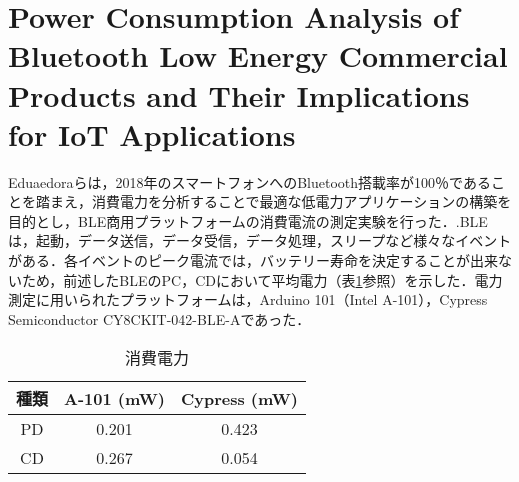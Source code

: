 \section{Power Consumption Analysis of Bluetooth Low Energy Commercial Products and Their Implications for IoT Applications}
Eduaedoraらは，2018年のスマートフォンへのBluetooth搭載率が100％であることを踏まえ，消費電力を分析することで最適な低電力アプリケーションの構築を目的とし，BLE商用プラットフォームの消費電流の測定実験を行った．\cite{Garcia-Espinosa2018}.BLEは，起動，データ送信，データ受信，データ処理，スリープなど様々なイベントがある．各イベントのピーク電流では，バッテリー寿命を決定することが出来ないため，前述したBLEのPC，CDにおいて平均電力（表\ref{fig:power_consumption}参照）を示した．電力測定に用いられたプラットフォームは，Arduino 101（Intel A-101），Cypress Semiconductor CY8CKIT-042-BLE-Aであった．

\begin{table}
    \raggedleft
    \caption{消費電力}
    \label{fig:power_consumption}
    \centering
    \begin{tabular}{|c|c|c|}
    \hline
    \textbf{種類} & \textbf{A-101 (mW)} & \textbf{Cypress (mW)} \\ \hline
    PD          & 0.201               & 0.423                 \\ \hline
    CD          & 0.267               & 0.054                 \\ \hline
    \end{tabular}
\end{table}